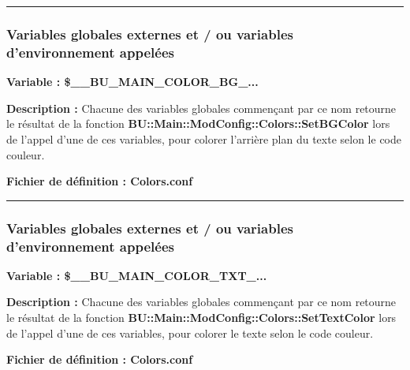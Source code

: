 \documentclass[a4paper,10pt]{article}
\begin{document}

\color{blue}\par\noindent\rule{\textwidth}{0.4pt}\color{white}

\color{blue}
\subsubsection{Variables globales externes et / ou variables d'environnement appelées}\color{white}

\textbf{Variable : \color{orange}\$\_\_BU\_MAIN\_COLOR\_BG\_...}\\[1\baselineskip]

\begin{justify}
    \textbf{Description :} Chacune des variables globales commençant par ce nom retourne le résultat de la fonction \textbf{\color{mauve}BU::Main::ModConfig::Colors::SetBGColor} lors de l'appel d'une de ces variables, pour colorer l'arrière plan du texte selon le code couleur.
\end{justify}

\textbf{Fichier de définition : \color{lime}Colors.conf}\\[1\baselineskip]



\color{blue}\par\noindent\rule{\textwidth}{0.4pt}\color{white}

\color{blue}
\subsubsection{Variables globales externes et / ou variables d'environnement appelées}\color{white}

\textbf{Variable : \color{orange}\$\_\_BU\_MAIN\_COLOR\_TXT\_...}\\[1\baselineskip]

\begin{justify}
    \textbf{Description :} Chacune des variables globales commençant par ce nom retourne le résultat de la fonction \textbf{\color{mauve}BU::Main::ModConfig::Colors::SetTextColor} lors de l'appel d'une de ces variables, pour colorer le texte selon le code couleur.
\end{justify}

\textbf{Fichier de définition : \color{lime}Colors.conf}\\[1\baselineskip]


\end{document}
